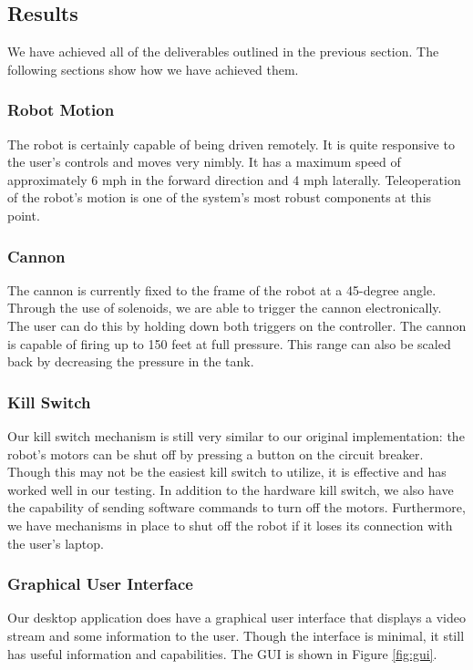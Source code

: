 \documentclass[letterpaper,12pt]{article}
\begin{document}
\subsection{Results}
We have achieved all of the deliverables outlined in the previous section. The
following sections show how we have achieved them.

\subsubsection{Robot Motion}
The robot is certainly capable of being driven remotely. It is quite responsive
to the user's controls and moves very nimbly. It has a maximum speed of
approximately 6 mph in the forward direction and 4 mph laterally. Teleoperation
of the robot's motion is one of the system's most robust components at this
point.

\subsubsection{Cannon}
The cannon is currently fixed to the frame of the robot at a 45-degree
angle. Through the use of solenoids, we are able to trigger the cannon
electronically. The user can do this by holding down both triggers on the
controller. The cannon is capable of firing up to 150 feet at full
pressure. This range can also be scaled back by decreasing the pressure in the
tank.

\subsubsection{Kill Switch}
Our kill switch mechanism is still very similar to our original implementation:
the robot's motors can be shut off by pressing a button on the circuit
breaker. Though this may not be the easiest kill switch to utilize, it is
effective and has worked well in our testing. In addition to the hardware kill
switch, we also have the capability of sending software commands to turn off the
motors. Furthermore, we have mechanisms in place to shut off the robot if it
loses its connection with the user's laptop.

\subsubsection{Graphical User Interface}
Our desktop application does have a graphical user interface that displays a
video stream and some information to the user. Though the interface is minimal,
it still has useful information and capabilities. The GUI is shown in Figure
\ref{fig:gui}.
\end{document}
